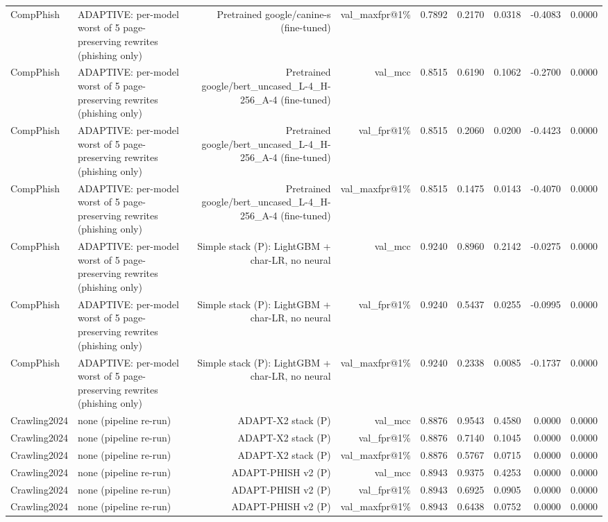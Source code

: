 \begin{table}[t]
\begin{tabular}{llrrrrrrr}
CompPhish & ADAPTIVE: per-model worst of 5 page-preserving rewrites (phishing only) & Pretrained google/canine-s (fine-tuned) & val\_maxfpr@1\% & 0.7892 & 0.2170 & 0.0318 & -0.4083 & 0.0000 \\
CompPhish & ADAPTIVE: per-model worst of 5 page-preserving rewrites (phishing only) & Pretrained google/bert\_uncased\_L-4\_H-256\_A-4 (fine-tuned) & val\_mcc & 0.8515 & 0.6190 & 0.1062 & -0.2700 & 0.0000 \\
CompPhish & ADAPTIVE: per-model worst of 5 page-preserving rewrites (phishing only) & Pretrained google/bert\_uncased\_L-4\_H-256\_A-4 (fine-tuned) & val\_fpr@1\% & 0.8515 & 0.2060 & 0.0200 & -0.4423 & 0.0000 \\
CompPhish & ADAPTIVE: per-model worst of 5 page-preserving rewrites (phishing only) & Pretrained google/bert\_uncased\_L-4\_H-256\_A-4 (fine-tuned) & val\_maxfpr@1\% & 0.8515 & 0.1475 & 0.0143 & -0.4070 & 0.0000 \\
CompPhish & ADAPTIVE: per-model worst of 5 page-preserving rewrites (phishing only) & Simple stack (P): LightGBM + char-LR, no neural & val\_mcc & 0.9240 & 0.8960 & 0.2142 & -0.0275 & 0.0000 \\
CompPhish & ADAPTIVE: per-model worst of 5 page-preserving rewrites (phishing only) & Simple stack (P): LightGBM + char-LR, no neural & val\_fpr@1\% & 0.9240 & 0.5437 & 0.0255 & -0.0995 & 0.0000 \\
CompPhish & ADAPTIVE: per-model worst of 5 page-preserving rewrites (phishing only) & Simple stack (P): LightGBM + char-LR, no neural & val\_maxfpr@1\% & 0.9240 & 0.2338 & 0.0085 & -0.1737 & 0.0000 \\
Crawling2024 & none (pipeline re-run) & ADAPT-X2 stack (P) & val\_mcc & 0.8876 & 0.9543 & 0.4580 & 0.0000 & 0.0000 \\
Crawling2024 & none (pipeline re-run) & ADAPT-X2 stack (P) & val\_fpr@1\% & 0.8876 & 0.7140 & 0.1045 & 0.0000 & 0.0000 \\
Crawling2024 & none (pipeline re-run) & ADAPT-X2 stack (P) & val\_maxfpr@1\% & 0.8876 & 0.5767 & 0.0715 & 0.0000 & 0.0000 \\
Crawling2024 & none (pipeline re-run) & ADAPT-PHISH v2 (P) & val\_mcc & 0.8943 & 0.9375 & 0.4253 & 0.0000 & 0.0000 \\
Crawling2024 & none (pipeline re-run) & ADAPT-PHISH v2 (P) & val\_fpr@1\% & 0.8943 & 0.6925 & 0.0905 & 0.0000 & 0.0000 \\
Crawling2024 & none (pipeline re-run) & ADAPT-PHISH v2 (P) & val\_maxfpr@1\% & 0.8943 & 0.6438 & 0.0752 & 0.0000 & 0.0000 \\

\end{tabular}
\end{table}
